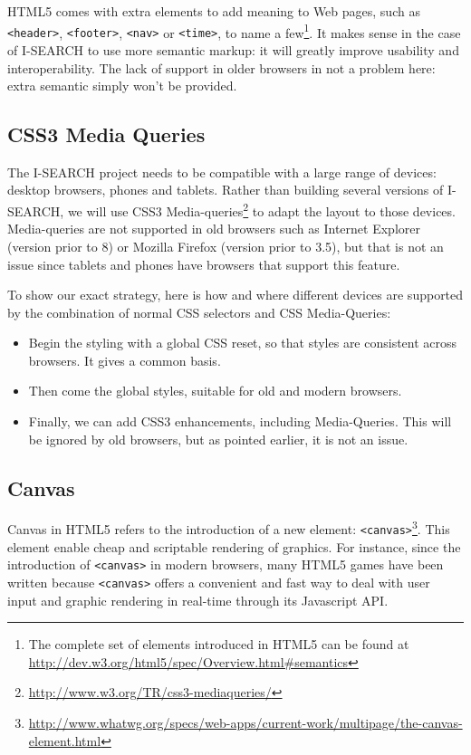 \documentclass[runningheads,a4paper]{llncs} \usepackage[utf8]{inputenc}
\begin{document}
HTML5 comes with extra elements to add meaning to Web pages, such as {\tt <header>}, {\tt <footer>}, {\tt <nav>} or {\tt <time>}, to name a few\footnote{The complete set of elements introduced in HTML5 can be found at \url{http://dev.w3.org/html5/spec/Overview.html\#semantics}}. It makes sense in the case of \mbox{I-SEARCH} to use more semantic markup: it will greatly improve usability and interoperability\cite{}.
The lack of support in older browsers in not a problem here: extra semantic simply won't be provided.

\subsection{CSS3 Media Queries} 

The \mbox{I-SEARCH} project needs to be compatible with a large range of devices: desktop browsers, phones and tablets. Rather than building several versions of \mbox{I-SEARCH}, we will use CSS3 Media-queries\footnote{\url{http://www.w3.org/TR/css3-mediaqueries/}} to adapt the layout to those devices. Media-queries are not supported in old browsers such as Internet Explorer (version prior to 8) or Mozilla Firefox (version prior to 3.5), but that is not an issue since tablets and phones have browsers that support this feature.

To show our exact strategy, here is how and where different devices are supported by the combination of normal CSS selectors and CSS Media-Queries: 
\begin{itemize}
\item Begin the styling with a global CSS reset, so that styles are consistent across browsers. It gives a common basis.
\item Then come the global styles, suitable for old and modern browsers.
\item Finally, we can add CSS3 enhancements, including Media-Queries. This will be ignored by old browsers, but as pointed earlier, it is not an issue.
\end{itemize}

\subsection{Canvas}

Canvas in HTML5 refers to the introduction of a new element: {\tt <canvas>}\footnote{\url{http://www.whatwg.org/specs/web-apps/current-work/multipage/the-canvas-element.html}}. This element enable cheap and scriptable rendering of graphics. For instance, since the introduction of {\tt <canvas>} in modern browsers, many HTML5 games have been written because {\tt <canvas>} offers a convenient and fast way to deal with user input and graphic rendering in real-time through its Javascript API. 
\end{document}
